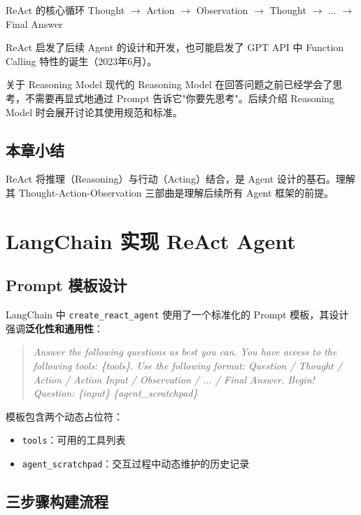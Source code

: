 \documentclass[a4paper]{article}
\begin{document}
\begin{importantbox}{ReAct 的核心循环}
Thought $\rightarrow$ Action $\rightarrow$ Observation $\rightarrow$ Thought $\rightarrow$ ... $\rightarrow$ Final Answer

ReAct 启发了后续 Agent 的设计和开发，也可能启发了 GPT API 中 Function Calling 特性的诞生（2023年6月）。
\end{importantbox}

\begin{knowledgebox}{关于 Reasoning Model}
现代的 Reasoning Model 在回答问题之前已经学会了思考，不需要再显式地通过 Prompt 告诉它"你要先思考"。后续介绍 Reasoning Model 时会展开讨论其使用规范和标准。
\end{knowledgebox}

\subsection{本章小结}
ReAct 将推理（Reasoning）与行动（Acting）结合，是 Agent 设计的基石。理解其 Thought-Action-Observation 三部曲是理解后续所有 Agent 框架的前提。

\section{LangChain 实现 ReAct Agent}

\subsection{Prompt 模板设计}

LangChain 中 \texttt{create\_react\_agent} 使用了一个标准化的 Prompt 模板，其设计强调\textbf{泛化性和通用性}：

\begin{quote}
\textit{Answer the following questions as best you can. You have access to the following tools: \{tools\}. Use the following format: Question / Thought / Action / Action Input / Observation / ... / Final Answer. Begin! Question: \{input\} \{agent\_scratchpad\}}
\end{quote}

模板包含两个动态占位符：
\begin{itemize}
    \item \texttt{tools}：可用的工具列表
    \item \texttt{agent\_scratchpad}：交互过程中动态维护的历史记录
\end{itemize}

\subsection{三步骤构建流程}
\end{document}
